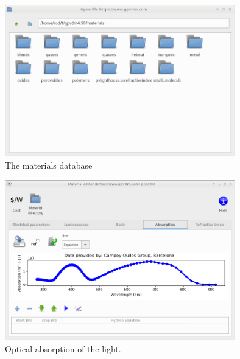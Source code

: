 \begin{figure}[h!]
\centering
\includegraphics[width=100mm]{./images/running/db.png}
\caption{The materials database}
\label{fig:db}
\end{figure}

\begin{figure}[h!]
\centering
\includegraphics[width=100mm]{./images/running/alpha.png}
\caption{Optical absorption of the light.}
\label{fig:alpha}
\end{figure}

\vspace*{\fill}


